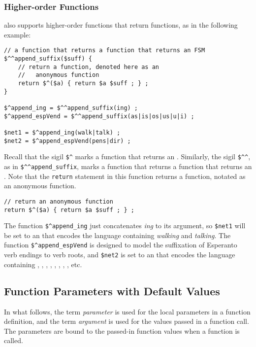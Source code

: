 \subsubsection{Higher-order Functions}

\Kleene{} also supports higher-order functions that return functions,
as in the following example:

\begin{Verbatim}
// a function that returns a function that returns an FSM 
$^^append_suffix($suff) {
    // return a function, denoted here as an
    //   anonymous function
    return $^($a) { return $a $suff ; } ;
}

$^append_ing = $^^append_suffix(ing) ;
$^append_espVend = $^^append_suffix(as|is|os|us|u|i) ;

$net1 = $^append_ing(walk|talk) ;
$net2 = $^append_espVend(pens|dir) ;
\end{Verbatim}

\noindent
Recall that the sigil \verb!$^! marks a function that returns an \fsm{}. Similarly,
the sigil \verb!$^^!, as in \verb!$^^append_suffix!, marks a function that returns a function that returns an
\fsm{}.  Note that the \texttt{return} statement in this function returns a function, notated as an anonymous
function.

\begin{Verbatim}
// return an anonymous function
return $^($a) { return $a $suff ; } ;
\end{Verbatim}

The function \verb!$^append_ing! just concatenates \emph{ing} to
its \fsm{} argument, so \verb!$net1! will be set to an \fsm{} that
encodes the language containing \emph{walking} and \emph{talking}.
The function \verb!$^append_espVend! is designed to model the
suffixation of Esperanto verb endings to verb roots, and
\verb!$net2! is set to an \fsm{} that encodes the language
containing , , ,
, , , , , etc.


\subsection{Function Parameters with Default Values}

In what follows, the term \emph{parameter} is used for the local
parameters in a function definition, and the term \emph{argument} is
used for the values passed in a function call.  The parameters are bound to the passed-in 
function values when a function
is called.


